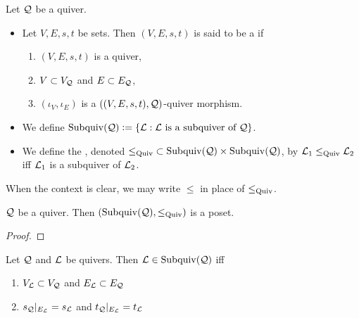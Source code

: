 \documentclass{book}
\begin{document}
	\begin{defn}
		Let $\mathcal{Q}$ be a quiver. 
		\begin{itemize}
			\item Let $V, E, s, t$ be sets. Then $(V, E, s, t)$ is said to be a  if 
			\begin{enumerate}
				\item $(V, E, s, t)$ is a quiver,
				\item $V \subset V_{\mathcal{Q}}$ and $E \subset E_{\mathcal{Q}}$,
				\item $(\iota_V, \iota_E)$ is a $((V, E, s, t), \mathcal{Q})$-quiver morphism. 
			\end{enumerate}
			\item We define $\operatorname{Subquiv}(\mathcal{Q}) \vcentcolon= \{\mathcal{L}: \text{$\mathcal{L}$ is a subquiver of $\mathcal{Q}$}\}$.
			\item We define the , denoted ${\leq_\text{Quiv}} \subset \operatorname{Subquiv}(\mathcal{Q}) \times \operatorname{Subquiv}(\mathcal{Q})$, by $\mathcal{L}_1 \leq_\text{Quiv} \mathcal{L}_2$ iff $\mathcal{L}_1$ is a subquiver of $\mathcal{L}_2$.  
		\end{itemize}
	\end{defn}
	
	\begin{note}
		When the context is clear, we may write $\leq$ in place of $\leq_\text{Quiv}$.
	\end{note}
	
	\begin{ex}
		$\mathcal{Q}$ be a quiver. Then $(\operatorname{Subquiv}(\mathcal{Q}), \leq_\text{Quiv})$ is a poset. 
	\end{ex}
	
	\begin{proof}
	\end{proof}
	
	\begin{ex}
		Let $\mathcal{Q}$ and $\mathcal{L}$ be quivers. Then $\mathcal{L} \in \operatorname{Subquiv}(\mathcal{Q})$ iff 
		\begin{enumerate}
			\item $V_{\mathcal{L}} \subset V_{\mathcal{Q}}$ and $E_{\mathcal{L}} \subset E_{\mathcal{Q}}$
			\item $s_{\mathcal{Q}}|_{E_{\mathcal{L}}} = s_{\mathcal{L}}$ and $t_{\mathcal{Q}}|_{E_{\mathcal{L}}} = t_{\mathcal{L}}$
		\end{enumerate} 
	\end{ex}
	
\end{document}
